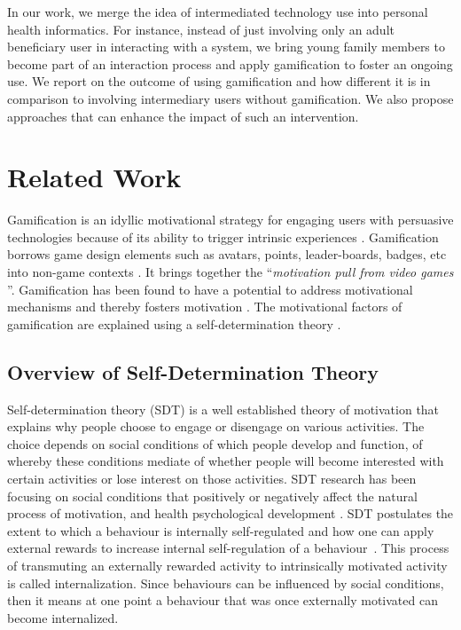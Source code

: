 \documentclass{sig-alternate}
\begin{document}
In our work, we merge the idea of intermediated technology use into personal health informatics. For instance, instead of just involving only an adult beneficiary user in interacting with a system, we bring young family members to become part of an interaction process and apply gamification to foster an ongoing use. We report on the outcome of using gamification and how different it is in comparison to involving intermediary users without gamification. We also propose approaches that can enhance the impact of such an intervention.
\section{Related Work} 
Gamification is an idyllic motivational strategy for engaging users with persuasive technologies because of its ability to trigger intrinsic experiences \cite{hamari2014persuasive}. Gamification borrows game design elements such as avatars, points, leader-boards, badges, etc into non-game contexts \cite{deterding2011game}. It brings together the ``\emph{motivation pull from video games} \cite{ryan2006:motivationalpull}''. Gamification has been found to have a potential to address motivational mechanisms and thereby fosters motivation \cite{sailer2013:psychological}. The motivational  factors of gamification are explained using a self-determination theory \cite{deci1985:intrinsic}.    
\subsection{Overview of Self-Determination Theory}
Self-determination theory (SDT) is a well established theory of motivation that explains why people choose to engage or disengage on various activities. The choice depends on social conditions of which people develop and function, of whereby these conditions mediate of whether people will become interested with certain activities or lose interest on those activities. SDT research has been focusing on social conditions that positively or negatively affect the natural process of motivation, and health psychological development \cite{ryan2000:self}. SDT postulates the extent to which a behaviour is internally self-regulated and how one can apply external rewards to increase internal self-regulation of a behaviour~\cite{ryan2000:self}. This process of transmuting an externally rewarded activity to intrinsically motivated activity is called internalization. Since behaviours can be influenced by social conditions, then it means at one point a behaviour that was once externally motivated can become internalized.
\end{document}
